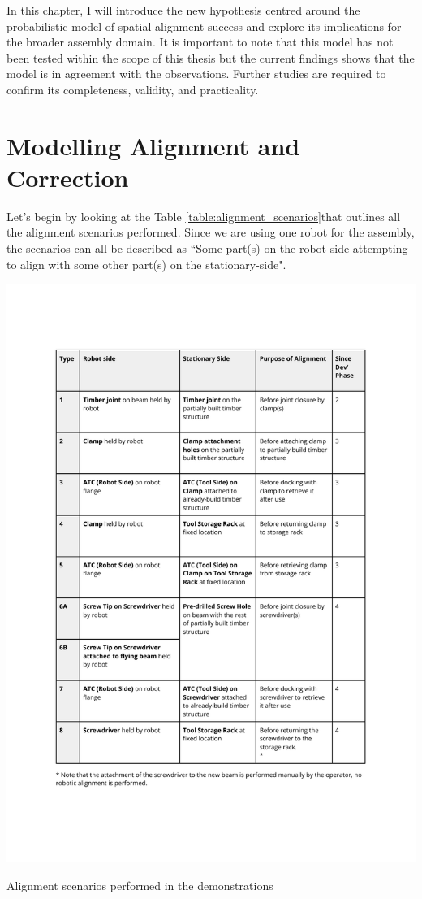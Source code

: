 In this chapter, I will introduce the new hypothesis centred around the probabilistic model of spatial alignment success and explore its implications for the broader assembly domain. It is important to note that this model has not been tested within the scope of this thesis but the current findings shows that the model is in agreement with the observations. Further studies are required to confirm its completeness, validity, and practicality. 

\section{Modelling Alignment and Correction}
\label{section:new_hypo_modelling_alignment_correction}

Let's begin by looking at the Table \ref{table:alignment_scenarios}that outlines all the alignment scenarios performed. Since we are using one robot for the assembly, the scenarios can all be described as ``Some part(s) on the robot-side attempting to align with some other part(s) on the stationary-side". 

\begin{table}
    \includegraphics[page=1, trim=25.4mm 35mm 25.4mm 33mm, clip, width=\textwidth]{tables/Tables in Chapter 9 to 11.pdf}
    \caption{Alignment scenarios performed in the demonstrations}
    \label{table:alignment_scenarios}
\end{table}

